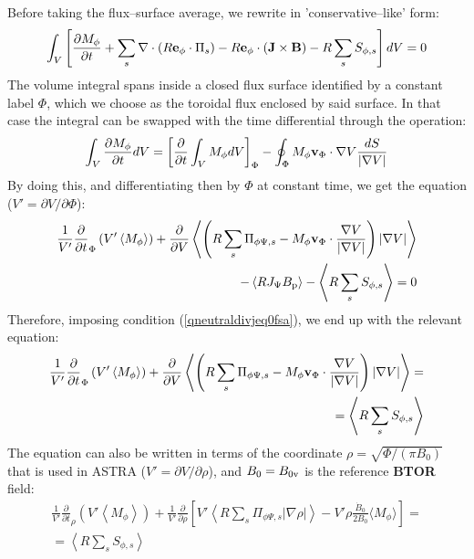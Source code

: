 Before taking the flux--surface average, we rewrite  in 'conservative--like' form:
\begin{eqnarray}
\int_V\left[\frac{\partial M_\phi}{\partial{t}} +
\sum_s \nabla\cdot\left(R\mathbf{e}_{\phi}\cdot\Pi_s\right)-R\mathbf{e}_{\phi}\cdot\left(
\mathbf{J}\times\mathbf{B}\right)  - R \sum_s S_{\phi,s}\right] dV=0
\label{momtranspeq3drephi2cons}
\end{eqnarray}
The volume integral spans inside a closed flux surface identified by a constant label $\Phi$, which we choose as the toroidal flux enclosed by said surface. In that case the integral can be swapped with the time differential through the operation:
\begin{eqnarray}
 \int_V \frac{\partial M_\phi}{\partial{t}} dV=\left[\frac{\partial }{\partial t}  \int_V M_\phi dV \right]_{\Phi} -\oint_{\Phi} M_\phi \mathbf{v}_{\Phi}\cdot \nabla{V} \frac{dS}{|\nabla{V}|}
\label{momtranspeq3drephi2consswap}
\end{eqnarray}
By doing this, and differentiating then by $\Phi$ at constant time, we get the equation ($V'=\partial V/\partial \Phi$):
\begin{eqnarray}
\frac{1}{V'}  \frac{\partial }{\partial{t}}_{\Phi}\left(V' \left\langle M_\phi \right\rangle\right) +\frac{\partial}{\partial V}\left\langle \left(R \sum_s \Pi_{\phi\Psi,s}-M_\phi\mathbf{v}_{\Phi}\cdot\frac{\nabla{V}}{|\nabla{V}|}\right)
|\nabla{V}| \right\rangle\nonumber \\
-\left\langle R J_\Psi B_{\rm p}\right\rangle  - 
\left\langle R \sum_s S_{\phi,s}\right\rangle=0
\label{momtranspeq3drephi2cons}
\end{eqnarray}
Therefore, imposing condition (\ref{qneutraldivjeq0fsa}), we end up with the relevant equation:
\begin{eqnarray}
\frac{1}{V'}  \frac{\partial }{\partial{t}}_{\Phi}\left(V' \left\langle M_\phi \right\rangle\right) + \frac{\partial}{\partial V}\left\langle \left(R \sum_s \Pi_{\phi\Psi,s}-M_\phi\mathbf{v}_{\Phi}\cdot\frac{\nabla{V}}{|\nabla{V}|}\right)
|\nabla{V}| \right\rangle=\nonumber \\ 
=\left\langle R \sum_s S_{\phi,s}\right\rangle
\label{momtranspeq3drephiFSA}
\end{eqnarray}
The equation can also be written in terms of the coordinate $\rho=\sqrt{\Phi/(\pi B_0)}$ that is used in ASTRA ($V'=\partial V/\partial \rho$), and $B_0=B_{\rm 0v}$ is the reference {\bf BTOR} field:
\begin{eqnarray}
\frac{1}{V'} \frac{\partial }{\partial{t}}_{\rho}\left(V' \left\langle M_\phi \right\rangle\right) +\frac{1}{V'}  \frac{\partial}{\partial \rho}\left[ V' \left\langle R \sum_s \Pi_{\phi\Psi,s}\vert \nabla{\rho}\vert\right\rangle
-V'\rho\frac{\dot{B}_0}{2 B_0}\langle  M_\phi \rangle \right]
=\nonumber \\ 
=\left\langle R \sum_s S_{\phi,s}\right\rangle
\label{momtranspeq3drephiFSArho}
\end{eqnarray}
